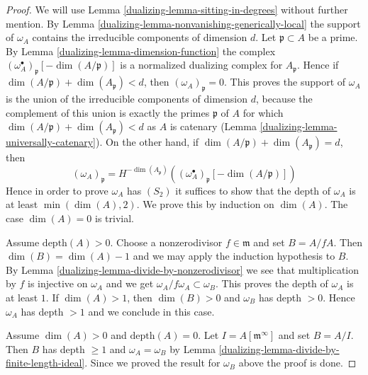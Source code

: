 \begin{proof}

We will use Lemma \ref{dualizing-lemma-sitting-in-degrees} without further mention.
By Lemma \ref{dualizing-lemma-nonvanishing-generically-local} the support
of $\omega_A$ contains the irreducible components of dimension $d$.
Let $\mathfrak p \subset A$ be a prime. By Lemma \ref{dualizing-lemma-dimension-function}
the complex $(\omega_A^\bullet)_{\mathfrak p}[-\dim(A/\mathfrak p)]$
is a normalized dualizing complex for $A_\mathfrak p$. Hence if
$\dim(A/\mathfrak p) + \dim(A_\mathfrak p) < d$, then
$(\omega_A)_\mathfrak p = 0$.
This proves the support of $\omega_A$ is the union of the irreducible
components of dimension $d$, because the complement of this union
is exactly the primes $\mathfrak p$ of $A$ for which
$\dim(A/\mathfrak p) + \dim(A_\mathfrak p) < d$ as $A$ is catenary
(Lemma \ref{dualizing-lemma-universally-catenary}).
On the other hand, if $\dim(A/\mathfrak p) + \dim(A_\mathfrak p) = d$, then
$$
(\omega_A)_\mathfrak p =
H^{-\dim(A_\mathfrak p)}\left(
(\omega_A^\bullet)_{\mathfrak p}[-\dim(A/\mathfrak p)] \right)
$$
Hence in order to prove $\omega_A$ has $(S_2)$ it suffices to show that
the depth of $\omega_A$ is at least $\min(\dim(A), 2)$.
We prove this by induction on $\dim(A)$. The case $\dim(A) = 0$ is
trivial.

\medskip\noindent
Assume $\text{depth}(A) > 0$. Choose a nonzerodivisor $f \in \mathfrak m$
and set $B = A/fA$. Then $\dim(B) = \dim(A) - 1$ and we may apply the
induction hypothesis to $B$. By Lemma \ref{dualizing-lemma-divide-by-nonzerodivisor}
we see that multiplication by $f$ is injective on $\omega_A$ and we get
$\omega_A/f\omega_A \subset \omega_B$. This proves the depth of $\omega_A$
is at least $1$. If $\dim(A) > 1$, then $\dim(B) > 0$ and $\omega_B$
has depth $ > 0$. Hence $\omega_A$ has depth $> 1$ and we conclude in
this case.

\medskip\noindent
Assume $\dim(A) > 0$ and $\text{depth}(A) = 0$. Let
$I = A[\mathfrak m^\infty]$ and set $B = A/I$. Then $B$ has
depth $\geq 1$ and $\omega_A = \omega_B$ by
Lemma \ref{dualizing-lemma-divide-by-finite-length-ideal}.
Since we proved the result for $\omega_B$ above the proof is done.
\end{proof}

